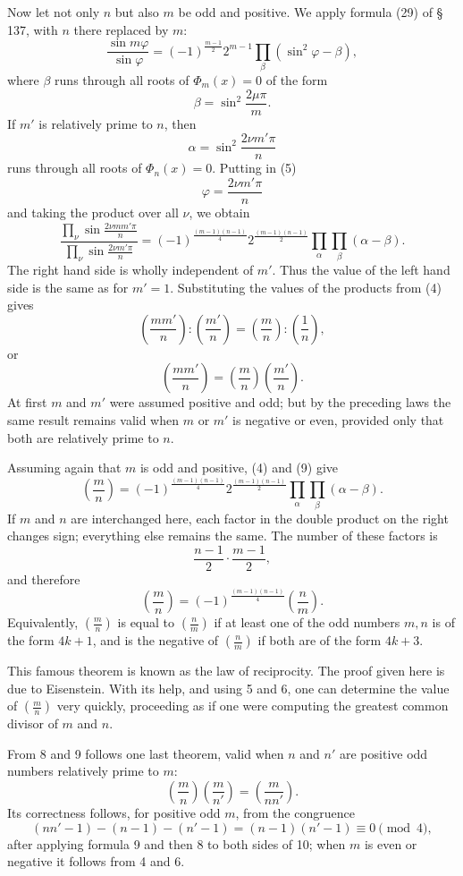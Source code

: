 \documentclass[11pt]{article}
\begin{document}
Now let not only $n$ but also $m$ be odd and positive. We apply formula (29) of §\,137, with $n$ there replaced by $m$:
\[
\tag{5}
\frac{\sin m\varphi}{\sin\varphi}
=(-1)^{\frac{m-1}{2}}2^{m-1}\prod_\beta(\sin^2\varphi-\beta),
\]
where $\beta$ runs through all roots of $\Phi_m(x)=0$ of the form
\[
\tag{6}
        \beta=\sin^2\frac{2\mu\pi}{m}.
\]
If $m'$ is relatively prime to $n$, then
\[
\tag{7}
        \alpha=\sin^2\frac{2\nu m'\pi}{n}
\]
runs through all roots of $\Phi_n(x)=0$. Putting in (5)
\[
\tag{8}
        \varphi=\frac{2\nu m'\pi}{n}
\]
and taking the product over all $\nu$, we obtain
\[
\tag{9}
\frac{\prod_\nu \sin\frac{2\nu m m'\pi}{n}}
     {\prod_\nu \sin\frac{2\nu m'\pi}{n}}
=(-1)^{\frac{(m-1)(n-1)}4}
2^{\frac{(m-1)(n-1)}2}\prod_\alpha\prod_\beta(\alpha-\beta).
\]
The right hand side is wholly independent of $m'$. Thus the value of the left hand side is the same as for $m'=1$. Substituting the values of the products from (4) gives
\[
        \left(\frac{mm'}n\right):\left(\frac{m'}n\right)
        =
        \left(\frac mn\right):\left(\frac 1n\right),
\]
or
\[
        \left(\frac{mm'}n\right)=
        \left(\frac mn\right)\left(\frac{m'}n\right).
\]
At first $m$ and $m'$ were assumed positive and odd; but by the preceding laws the same result remains valid when $m$ or $m'$ is negative or even, provided only that both are relatively prime to $n$.

Assuming again that $m$ is odd and positive, (4) and (9) give
\[
\tag{10}
\left(\frac mn\right)
=(-1)^{\frac{(m-1)(n-1)}4}
2^{\frac{(m-1)(n-1)}2}\prod_\alpha\prod_\beta(\alpha-\beta).
\]
If $m$ and $n$ are interchanged here, each factor in the double product on the right changes sign; everything else remains the same. The number of these factors is
\[
        \frac{n-1}{2}\cdot\frac{m-1}{2},
\]
and therefore
\[
\tag{9'}
        \left(\frac mn\right)
        =(-1)^{\frac{(m-1)(n-1)}4}\left(\frac nm\right).
\]
Equivalently, $\left(\frac mn\right)$ is equal to $\left(\frac nm\right)$ if at least one of the odd numbers $m,n$ is of the form $4k+1$, and is the negative of $\left(\frac nm\right)$ if both are of the form $4k+3$.

This famous theorem is known as the law of reciprocity. The proof given here is due to Eisenstein. With its help, and using 5 and 6, one can determine the value of $\left(\frac mn\right)$ very quickly, proceeding as if one were computing the greatest common divisor of $m$ and $n$.

From 8 and 9 follows one last theorem, valid when $n$ and $n'$ are positive odd numbers relatively prime to $m$:
\[
\tag{10'}
        \left(\frac mn\right)\left(\frac m{n'}\right)
        =
        \left(\frac m{nn'}\right).
\]
Its correctness follows, for positive odd $m$, from the congruence
\[
\tag{7'}
 (nn'-1)-(n-1)-(n'-1)
 = (n-1)(n'-1)\equiv0\pmod 4,
\]
after applying formula 9 and then 8 to both sides of 10; when $m$ is even or negative it follows from 4 and 6.
\end{document}
